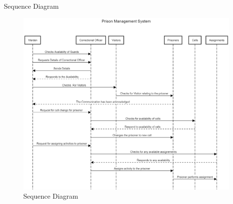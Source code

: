 \documentclass[aspectratio=169]{beamer}
\begin{document}
\begin{frame}{Sequence Diagram}
    \begin{figure}
        \centering
        \includegraphics[scale=0.15]{sequence.png}
        \caption{Sequence Diagram}
        \label{fig:sequence}
    \end{figure}
\end{frame}
\end{document}

